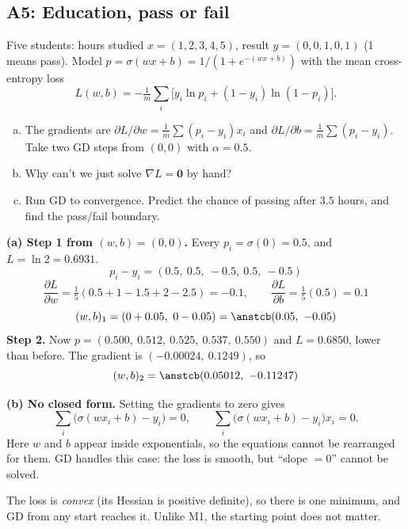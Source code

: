 \subsection{A5: Education, pass or fail}

\begin{frame}{}
  \begin{probbox}
    Five students: hours studied $x = (1, 2, 3, 4, 5)$, result $y = (0, 0, 1, 0, 1)$ (1 means pass).
    Model $p = \sigma(wx + b) = 1/(1 + e^{-(wx + b)})$ with the mean cross-entropy loss
    \[
      L(w, b) = -\tfrac1m\textstyle\sum_i\bigl[y_i\ln p_i + (1 - y_i)\ln(1 - p_i)\bigr].
    \]
    \begin{enumerate}[(a)]
      \item The gradients are $\partial L/\partial w = \tfrac1m\sum(p_i - y_i)x_i$ and $\partial L/\partial b = \tfrac1m\sum(p_i - y_i)$.
            Take two GD steps from $(0, 0)$ with $\alpha = 0.5$.
      \item Why can't we just solve $\nabla L = \mathbf 0$ by hand?
      \item Run GD to convergence. Predict the chance of passing after $3.5$ hours, and find the pass/fail boundary.
    \end{enumerate}
  \end{probbox}
\end{frame}

\begin{frame}{}
  \textbf{(a) Step 1 from $(w, b) = (0, 0)$.} Every $p_i = \sigma(0) = 0.5$, and $L = \ln 2 = 0.6931$.
  \[
    p_i - y_i = (0.5,\ 0.5,\ -0.5,\ 0.5,\ -0.5)
  \]
  \[
    \frac{\partial L}{\partial w} = \tfrac15(0.5 + 1 - 1.5 + 2 - 2.5) = -0.1,\qquad
    \frac{\partial L}{\partial b} = \tfrac15(0.5) = 0.1
  \]
  \[
    (w, b)_1 = (0 + 0.05,\ 0 - 0.05) = \ans{(0.05,\ -0.05)}
  \]
  \textbf{Step 2.} Now $p = (0.500,\ 0.512,\ 0.525,\ 0.537,\ 0.550)$ and $L = 0.6850$, lower than before.
  The gradient is $(-0.00024,\ 0.1249)$, so
  \[
    (w, b)_2 = \ans{(0.05012,\ -0.11247)}
  \]
\end{frame}

\begin{frame}{}
  \textbf{(b) No closed form.} Setting the gradients to zero gives
  \[
    \textstyle\sum_i\bigl(\sigma(wx_i + b) - y_i\bigr) = 0,\qquad \sum_i\bigl(\sigma(wx_i + b) - y_i\bigr)x_i = 0 .
  \]
  Here $w$ and $b$ appear inside exponentials, so the equations cannot be rearranged for them.
  GD handles this case: the loss is smooth, but ``slope $= 0$'' cannot be solved.

  \vspace{4pt}
  The loss is \emph{convex} (its Hessian is positive definite), so there is one minimum, and GD from any start
  reaches it. Unlike M1, the starting point does not matter.
\end{frame}

